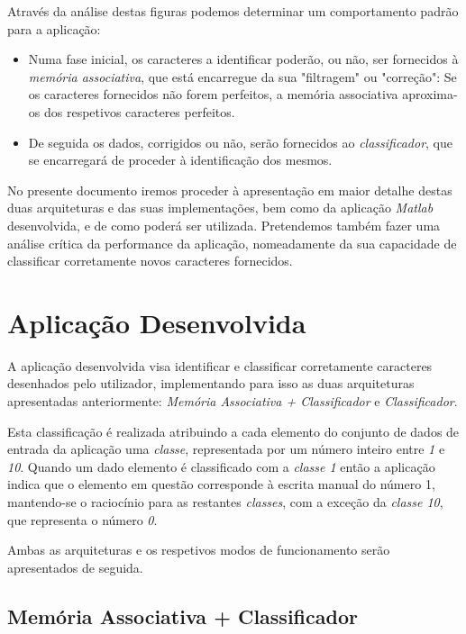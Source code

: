 \documentclass{article}
\begin{document}
Através da análise destas figuras podemos determinar um comportamento padrão para a aplicação:

\begin{itemize}
\item Numa fase inicial, os caracteres a identificar poderão, ou não, ser fornecidos à \emph{memória associativa}, que está encarregue da sua "filtragem" ou "correção": Se os caracteres fornecidos não forem perfeitos, a memória associativa aproxima-os dos respetivos caracteres perfeitos.

\item De seguida os dados, corrigidos ou não, serão fornecidos ao \emph{classificador}, que se encarregará de proceder à identificação dos mesmos.
\end{itemize}

No presente documento iremos proceder à apresentação em maior detalhe destas duas arquiteturas e das suas implementações, bem como da aplicação \emph{Matlab} desenvolvida, e de como poderá ser utilizada. Pretendemos também fazer uma análise crítica da performance da aplicação, nomeadamente da sua capacidade de classificar corretamente novos caracteres fornecidos.

\pagebreak

\section{Aplicação Desenvolvida}

A aplicação desenvolvida visa identificar e classificar corretamente caracteres desenhados pelo utilizador, implementando para isso as duas arquiteturas apresentadas anteriormente: \emph{Memória Associativa + Classificador} e \emph{Classificador}.

Esta classificação é realizada atribuindo a cada elemento do conjunto de dados de entrada da aplicação uma \emph{classe}, representada por um número inteiro entre \emph{1} e \emph{10}. Quando um dado elemento é classificado com a \emph{classe 1} então a aplicação indica que o elemento em questão corresponde à escrita manual do número {1}, mantendo-se o raciocínio para as restantes \emph{classes}, com a exceção da \emph{classe 10}, que representa o número \emph{0}.

Ambas as arquiteturas e os respetivos modos de funcionamento serão apresentados de seguida.

\subsection{Memória Associativa + Classificador}
\end{document}
